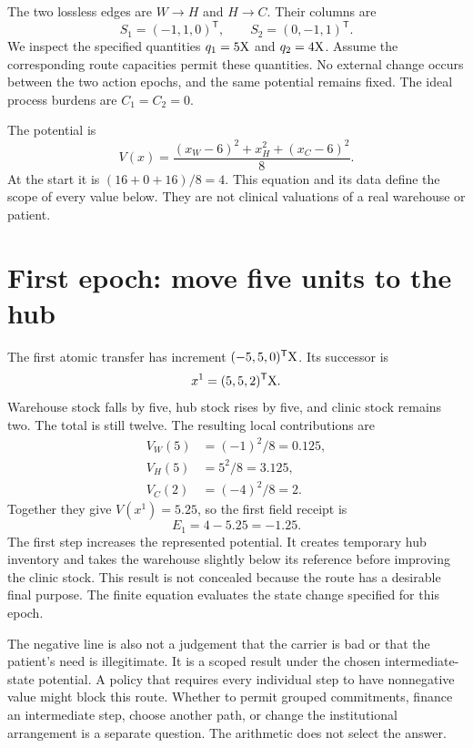 The two lossless edges are \(W\to H\) and \(H\to C\). Their columns are
\begin{equation}
S_1=(-1,1,0)^{\mathsf T},\qquad S_2=(0,-1,1)^{\mathsf T}.
\end{equation}
We inspect the specified quantities \(q_1=5\mathrm{X}\) and \(q_2=4\mathrm{X}\). Assume the corresponding route capacities permit these quantities. No external change occurs between the two action epochs, and the same potential remains fixed. The ideal process burdens are \(C_1=C_2=0\).

The potential is
\begin{equation}
V(x)=\frac{(x_W-6)^2+x_H^2+(x_C-6)^2}{8}.
\end{equation}
At the start it is \((16+0+16)/8=4\). This equation and its data define the scope of every value below. They are not clinical valuations of a real warehouse or patient.

\section{First epoch: move five units to the hub}

The first atomic transfer has increment \((-5,5,0)^{\mathsf T}\mathrm{X}\). Its successor is
\begin{equation}
x^1=(5,5,2)^{\mathsf T}\mathrm{X}.
\end{equation}
Warehouse stock falls by five, hub stock rises by five, and clinic stock remains two. The total is still twelve. The resulting local contributions are
\begin{align}
V_W(5)&=(-1)^2/8=0.125,\\
V_H(5)&=5^2/8=3.125,\\
V_C(2)&=(-4)^2/8=2.
\end{align}
Together they give \(V(x^1)=5.25\), so the first field receipt is
\begin{equation}
E_1=4-5.25=-1.25.
\end{equation}
The first step increases the represented potential. It creates temporary hub inventory and takes the warehouse slightly below its reference before improving the clinic stock. This result is not concealed because the route has a desirable final purpose. The finite equation evaluates the state change specified for this epoch.

The negative line is also not a judgement that the carrier is bad or that the patient's need is illegitimate. It is a scoped result under the chosen intermediate-state potential. A policy that requires every individual step to have nonnegative value might block this route. Whether to permit grouped commitments, finance an intermediate step, choose another path, or change the institutional arrangement is a separate question. The arithmetic does not select the answer.


